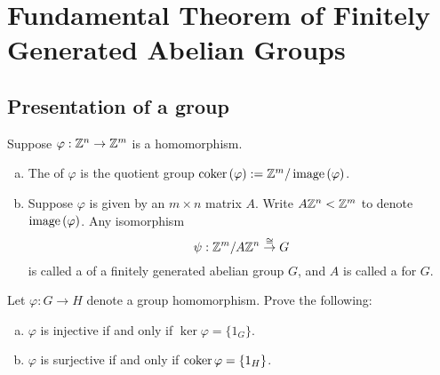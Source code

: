 \documentclass[../algebraNotesMSRI-UP2016.tex]{subfiles}
\begin{document}
\section[\S \thesection]{Fundamental Theorem of Finitely Generated Abelian Groups}\label{sec:2p10FTOFinitelyGeneratedAbelianGroups}
\subsection[\subsecname]{Presentation of a group}
\begin{frame}{\subsecname}{}
\begin{dfn}
Suppose $\varphi:\mathbb Z^n\to \mathbb Z^m$ is a homomorphism.
\begin{enumerate}[(a)]
\item The  of $\varphi$ is the quotient group $\operatorname{coker}{(\varphi)}:=\mathbb Z^m/	\operatorname{image}{(\varphi)}$.
\item Suppose $\varphi$ is given by an $m\times n$ matrix $A$.  Write $A\Z^n<%
\Z^m$ to denote $\operatorname{image}{(\varphi)}$.  Any isomorphism
\[
\psi: \mathbb Z^m/A\mathbb Z^n\overset{\cong}{\to} G
\]
is called a  of a finitely generated abelian group $G$, and $A$ is called a  for $G$.
\end{enumerate}
\end{dfn}
\end{frame}

\begin{frame}[c]{}{}
\begin{exe}\label{exe:kernelsAndCokernels}
Let $\varphi:G\to H$ denote a group homomorphism.  Prove the following:
\begin{enumerate}[(a)]
\item $\varphi$ is injective if and only if $\ker{\varphi}=\{1_G\}$.
\item $\varphi$ is surjective if and only if $\operatorname{coker}{\varphi}=\{1_H\}$.
\end{enumerate}
\end{exe}
\end{frame}
\end{document}
